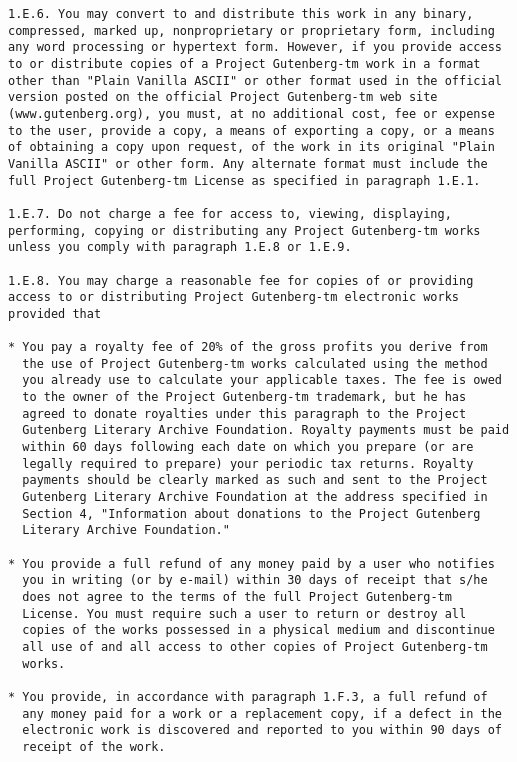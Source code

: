 \documentclass[oneside]{book}
\begin{document}
\begin{verbatim}
1.E.6. You may convert to and distribute this work in any binary,
compressed, marked up, nonproprietary or proprietary form, including
any word processing or hypertext form. However, if you provide access
to or distribute copies of a Project Gutenberg-tm work in a format
other than "Plain Vanilla ASCII" or other format used in the official
version posted on the official Project Gutenberg-tm web site
(www.gutenberg.org), you must, at no additional cost, fee or expense
to the user, provide a copy, a means of exporting a copy, or a means
of obtaining a copy upon request, of the work in its original "Plain
Vanilla ASCII" or other form. Any alternate format must include the
full Project Gutenberg-tm License as specified in paragraph 1.E.1.

1.E.7. Do not charge a fee for access to, viewing, displaying,
performing, copying or distributing any Project Gutenberg-tm works
unless you comply with paragraph 1.E.8 or 1.E.9.

1.E.8. You may charge a reasonable fee for copies of or providing
access to or distributing Project Gutenberg-tm electronic works
provided that

* You pay a royalty fee of 20% of the gross profits you derive from
  the use of Project Gutenberg-tm works calculated using the method
  you already use to calculate your applicable taxes. The fee is owed
  to the owner of the Project Gutenberg-tm trademark, but he has
  agreed to donate royalties under this paragraph to the Project
  Gutenberg Literary Archive Foundation. Royalty payments must be paid
  within 60 days following each date on which you prepare (or are
  legally required to prepare) your periodic tax returns. Royalty
  payments should be clearly marked as such and sent to the Project
  Gutenberg Literary Archive Foundation at the address specified in
  Section 4, "Information about donations to the Project Gutenberg
  Literary Archive Foundation."

* You provide a full refund of any money paid by a user who notifies
  you in writing (or by e-mail) within 30 days of receipt that s/he
  does not agree to the terms of the full Project Gutenberg-tm
  License. You must require such a user to return or destroy all
  copies of the works possessed in a physical medium and discontinue
  all use of and all access to other copies of Project Gutenberg-tm
  works.

* You provide, in accordance with paragraph 1.F.3, a full refund of
  any money paid for a work or a replacement copy, if a defect in the
  electronic work is discovered and reported to you within 90 days of
  receipt of the work.


\end{verbatim}
\end{document}

